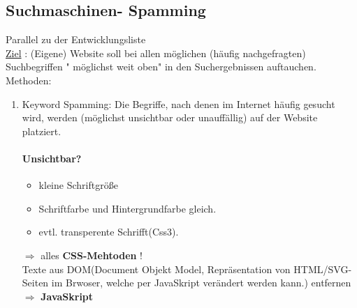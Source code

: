 \subsection{Suchmaschinen- Spamming}
Parallel zu der Entwicklungsliste\\
\underline{Ziel} : (Eigene) Website soll bei allen möglichen (häufig nachgefragten) Suchbegriffen " möglichst weit oben" in den Suchergebnissen auftauchen. 
Methoden:
\begin{enumerate}
\item Keyword Spamming: Die Begriffe, nach denen im Internet häufig gesucht wird, werden (möglichst unsichtbar oder unauffällig) auf der Website platziert.
\paragraph{Unsichtbar?}
\begin{itemize}
\item kleine Schriftgröße
\item Schriftfarbe und Hintergrundfarbe gleich.
\item evtl. transperente Schrifft(Css3).
\end{itemize}
$\Rightarrow$ alles \textbf{CSS-Mehtoden} !\\
Texte aus DOM(Document Objekt Model, Repräsentation von HTML/SVG-Seiten im Brwoser, welche per JavaSkript verändert werden kann.) entfernen $\Rightarrow$ \textbf{JavaSkript}

\end{enumerate}

